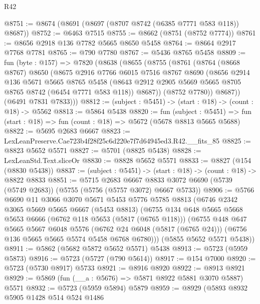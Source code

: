 \begin{lexlean}{R42}
\begin{coremodule}
@8751 := @8674 (@8691 (@8697 (@8707 @8742 (@6385 @7771 @583 @118)) @8687))
@8752 := @6463 @7515
@8755 := @8662 (@8751 (@8752 @7774))
@8761 := @8656 @2918 @136 @7782 @5665 @8650 @5458
@8764 := @8664 @2917 @7768 @7781
@8765 := @790 @7780
@8767 := @5436 @8765 @5458
@8809 := fun (byte : @157) =>
  @7820
    (@8638
      (@8655
        (@8755
          (@8761
            (@8764
              (@8668 @8767)
              @8650
              (@8675
                @2916
                @7766
                @6015
                @7516
                @8767
                @8690
                (@8656
                  @2914
                  @136
                  @5671
                  @5665
                  @8765
                  @5458
                  (@8643 @2912 @2905 @5669 @5665 @8705 @8765 @8742 (@6454 @7771 @583 @118))
                  @8687))
              (@8752 @7780))
            @8687))
        (@6491 @7831 @7833)))
@8812 := (subject : @5451) -> (start : @18) -> (count : @18) -> @5562
@8813 := @5864 @5438
@8820 := fun (subject : @5451) =>
  fun (start : @18) => fun (count : @18) => @5672 (@5678 @8813 @5665 @5688)
@8822 := @5695 @2683 @6667
@8823 := LexLeanPreserve.Cae723b4f28f25c6d220e7f7d64945ed3.R42.__fits_85
@8825 := @8823 @5652 @5571
@8827 := @5701 (@8825 @5438)
@8828 := LexLeanStd.Text.sliceOr
@8830 := @8828 @5652 @5571
@8833 := @8827 (@154 (@8830 @5438))
@8837 := (subject : @5451) -> (start : @18) -> (count : @18) -> @8822 @8833
@8851 := @5715
    @2683
    @6667
    @8833
    @3072
    @6690
    (@5739 (@5749 @2683))
    (@5755 (@5756 (@5757 @3072) @6667 @5733))
@8906 := @5766
    @6690
    @11
    @3066
    @3070
    @5671
    @5453
    @5776
    @5785
    @8813
    (@6746
      @2342
      @3065
      @5669
      @5665
      @6667
      (@5453 @8813)
      (@6755
        @134
        @648
        @5665
        @5668
        @5653
        @6666
        (@6762 @118 @5653 (@5817 (@6765 @118)))
        (@6755
          @448
          @647
          @5665
          @5667
          @6048
          @5576
          (@6762 @24 @6048 (@5817 (@6765 @24)))
          (@6756 @136 @5665 @5665 @5574 @5458 @6768 @6780)))
      (@5855 @5652 @5571 @5438))
@8911 := @5862 (@5682 @5872 @5652 @5571) @5438
@8913 := @5723 (@5959 @5873)
@8916 := @5723 (@5727 (@790 @5614))
@8917 := @154 @7000
@8920 := @5723 (@5730 @8917) @5733
@8921 := @8916 @8920
@8922 := @8913 @8921
@8929 := @5869 (fun (__a : @5676) => @5871 @8922 @5881 @3070 @5887) @5571
@8932 := @5723 (@5959 @5894) @5879
@8959 := @8929
    (@5893
      @8932
      @5905
      @1428
      @514
      @524
      @1486

\end{coremodule}
\end{lexlean}
